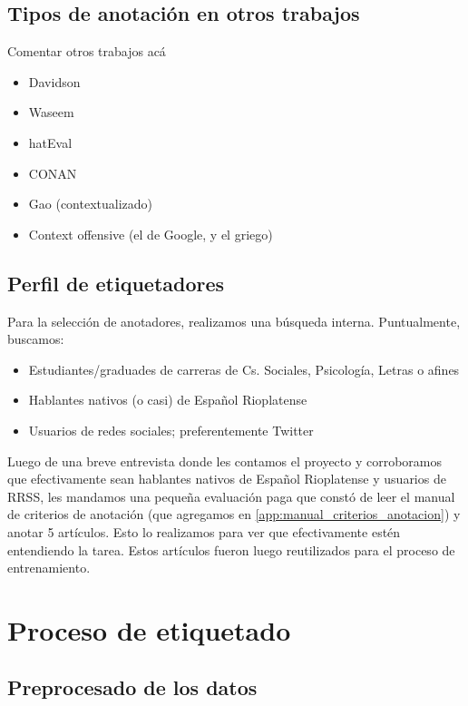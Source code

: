 \subsection{Tipos de anotación en otros trabajos}

Comentar otros trabajos acá

\begin{itemize}
    \item Davidson
    \item Waseem
    \item hatEval
    \item CONAN
    \item Gao (contextualizado)
    \item Context offensive (el de Google, y el griego)
\end{itemize}

\subsection{Perfil de etiquetadores}

Para la selección de anotadores, realizamos una búsqueda interna. Puntualmente, buscamos:

\begin{itemize}
    \item Estudiantes/graduades de carreras de Cs. Sociales, Psicología, Letras o afines
    \item Hablantes nativos (o casi) de Español Rioplatense
    \item Usuarios de redes sociales; preferentemente Twitter
\end{itemize}

Luego de una breve entrevista donde les contamos el proyecto y corroboramos que efectivamente sean hablantes nativos de Español Rioplatense y usuarios de RRSS, les mandamos una pequeña evaluación paga que constó de leer el manual de criterios de anotación (que agregamos en \ref{app:manual_criterios_anotacion}) y anotar 5 artículos. Esto lo realizamos para ver que efectivamente estén entendiendo la tarea. Estos artículos fueron luego reutilizados para el proceso de entrenamiento.

\section{Proceso de etiquetado}

\subsection{Preprocesado de los datos}

